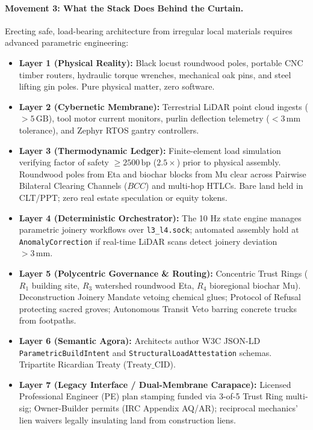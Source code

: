 \paragraph{Movement 3: What the Stack Does Behind the Curtain.}
Erecting safe, load-bearing architecture from irregular local materials requires advanced parametric engineering:
\begin{itemize}
    \item \textbf{Layer 1 (Physical Reality):} Black locust roundwood poles, portable CNC timber routers, hydraulic torque wrenches, mechanical oak pins, and steel lifting gin poles. Pure physical matter, zero software.
    \item \textbf{Layer 2 (Cybernetic Membrane):} Terrestrial LiDAR point cloud ingests ($> 5\,\mathrm{GB}$), tool motor current monitors, purlin deflection telemetry ($< 3\,\mathrm{mm}$ tolerance), and Zephyr RTOS gantry controllers.
    \item \textbf{Layer 3 (Thermodynamic Ledger):} Finite-element load simulation verifying factor of safety $\ge 2500\,\mathrm{bp}$ ($2.5\times$) prior to physical assembly. Roundwood poles from Eta and biochar blocks from Mu clear across Pairwise Bilateral Clearing Channels ($BCC$) and multi-hop HTLCs. Bare land held in CLT/PPT; zero real estate speculation or equity tokens.
    \item \textbf{Layer 4 (Deterministic Orchestrator):} The 10 Hz state engine manages parametric joinery workflows over \texttt{l3\_l4.sock}; automated assembly hold at \texttt{AnomalyCorrection} if real-time LiDAR scans detect joinery deviation $> 3\,\mathrm{mm}$.
    \item \textbf{Layer 5 (Polycentric Governance \& Routing):} Concentric Trust Rings ($R_1$ building site, $R_3$ watershed roundwood Eta, $R_4$ bioregional biochar Mu). Deconstruction Joinery Mandate vetoing chemical glues; Protocol of Refusal protecting sacred groves; Autonomous Transit Veto barring concrete trucks from footpaths.
    \item \textbf{Layer 6 (Semantic Agora):} Architects author W3C JSON-LD \texttt{ParametricBuildIntent} and \texttt{StructuralLoadAttestation} schemas. Tripartite Ricardian Treaty ($\mathrm{Treaty\_CID}$).
    \item \textbf{Layer 7 (Legacy Interface / Dual-Membrane Carapace):} Licensed Professional Engineer (PE) plan stamping funded via 3-of-5 Trust Ring multi-sig; Owner-Builder permits (IRC Appendix AQ/AR); reciprocal mechanics' lien waivers legally insulating land from construction liens.
\end{itemize}

